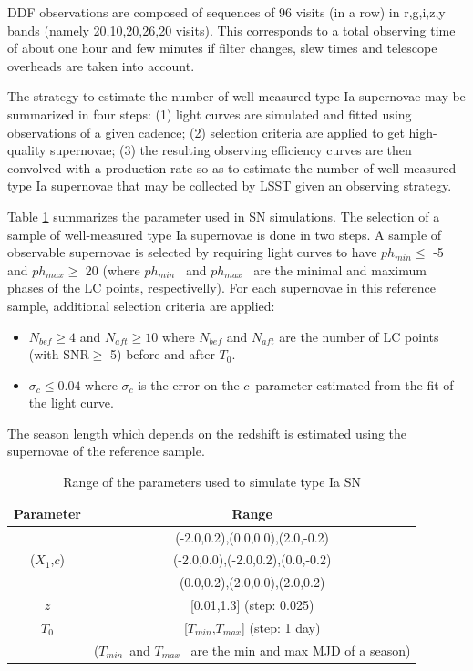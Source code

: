 \documentclass [11pt,a4paper]{article}
\newcommand{\strech}{$X_1$}
\newcommand{\sncolor}{$c$}
\newcommand{\daymax}{$T_0$}
\newcommand{\redshift}{$z$}
\newcommand{\tmin}{$T_{min}$}
\newcommand{\tmax}{$T_{max}$}
\newcommand{\phasemin}{$ph_{min}$}
\newcommand{\phasemax}{$ph_{max}$}
\begin{document}
DDF observations are composed of sequences of 96 visits (in a row) in r,g,i,z,y bands (namely 20,10,20,26,20 visits). This corresponds to a total observing time of about one hour and few minutes if filter changes, slew times and telescope overheads are taken into account.

The strategy to estimate the number of well-measured type Ia supernovae may be summarized in four steps: (1) light curves are simulated and fitted using observations of a given cadence; (2) selection criteria are applied to get high-quality supernovae; (3) the resulting observing efficiency curves are then convolved with a production rate \cite{perrett} so as to estimate the number of well-measured type Ia supernovae that may be collected by LSST given an observing strategy. 

Table \ref{tab:sim_ddf} summarizes the parameter used in SN simulations. The selection of a sample of well-measured type Ia supernovae is done in two steps. A sample of observable supernovae is selected by requiring light curves to have \phasemin $\leq$ -5 and \phasemax $\geq$ 20 (where \phasemin~ and \phasemax~ are the minimal and maximum phases of the LC points, respectivelly). For each supernovae in this reference sample, additional selection criteria are applied:
\begin{itemize}
\item $N_{bef} \geq 4$ and $N_{aft} \geq 10$ where $N_{bef}$ and $N_{aft}$ are the number of LC points (with SNR$\geq$ 5) before and after \daymax.
 \item $\sigma_c \leq 0.04$ where $\sigma_c$ is the error on the \sncolor~parameter estimated from the fit of the light curve.
\end{itemize}
The season length which depends on the redshift is estimated using the supernovae of the reference sample.

\begin{table}[!htbp]
\begin{center}
\begin{tabular}{|c|c|}
\hline
Parameter & Range \\
\hline
                    & (-2.0,0.2),(0.0,0.0),(2.0,-0.2) \\
 (\strech,\sncolor) & (-2.0,0.0),(-2.0,0.2),(0.0,-0.2) \\
                    & (0.0,0.2),(2.0,0.0),(2.0,0.2) \\
\hline
\redshift           & [0.01,1.3] (step: 0.025) \\
\hline
\daymax             & [\tmin,\tmax] (step: 1 day) \\
                    & (\tmin~and \tmax~ are the min and max MJD of a season) \\
                    \hline
\end{tabular}
\caption{Range of the parameters used to simulate type Ia SN}\label{tab:sim_ddf}
\end{center}
\end{table}
\end{document}
